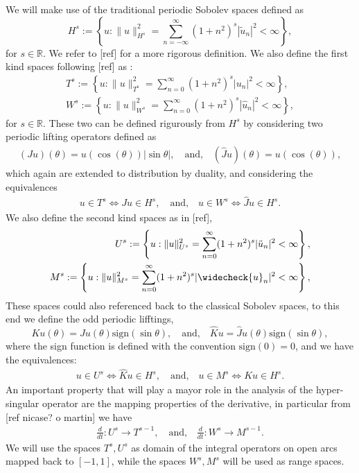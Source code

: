 \documentclass{article}
\newcommand{\todo}[1]{{\color{red}[#1]}}
\newcommand{\IR}{{\mathbb R}}
\begin{document}
We will make use of the traditional periodic Sobolev spaces defined as 
$$
H^s := \left\lbrace u : \| u\|_{H^s}^2 = \sum_{n=-\infty}^\infty (1+n^2)^s |\widetilde{u}_n|^2 < \infty \right\rbrace,
$$
for $s\in \IR$. We refer to \todo{ref} for a more rigorous definition. We also define the first kind spaces following \todo{ref} as : 
\begin{align*}
T^s := \left\lbrace u : \| u\|_{T^s}^2 = \sum_{n=0}^\infty (1+n^2)^s |{u}_n|^2 < \infty \right\rbrace, \\
W^s := \left\lbrace u : \| u\|_{W^s}^2 = \sum_{n=0}^\infty (1+n^2)^s |\widehat{u}_n|^2 < \infty \right\rbrace,
\end{align*} 
for $s \in \IR$. These two can be defined rigurously from $H^s$ by considering two periodic lifting operators defined as 
\begin{align}
\label{eq:liffings}
(Ju) (\theta) = u(\cos(\theta)) | \sin \theta|, \quad \text{and,} \quad
(\widehat{J}u)(\theta) = u (\cos(\theta)),
\end{align}
which again are extended to distribution by duality, and considering the equivalences 
\begin{align*}
u \in T^s \Leftrightarrow Ju \in H^s, \quad \text{and,} \quad u \in W^s \Leftrightarrow \widehat{J}u \in H^s.
\end{align*}
We also define the second kind spaces as in \todo{ref}, 
\begin{align*}
U^s := \left\lbrace u : \| u\|_{U^s}^2 = \sum_{n=0}^\infty (1+n^2)^s |\ddot{u}_n|^2 < \infty \right\rbrace, \\
M^s := \left\lbrace u : \| {u}\|_{M^s}^2 = \sum_{n=0}^\infty (1+n^2)^s |\widecheck{u}_n|^2 < \infty \right\rbrace,
\end{align*} 
These spaces could also referenced back to the classical Sobolev spaces, to this end we define the odd periodic lifftings, 
$$
Ku(\theta) = Ju(\theta) \text{sign}(\sin\theta), \quad \text{and,}\quad \widehat{K}u = \widehat{J}u(\theta) \text{sign}(\sin\theta),
$$
where the sign function is defined with the convention $\text{sign}(0)=0$, and we have the equivalences: 
\begin{align*}
u \in U^s \Leftrightarrow \widehat{K}u \in H^s, \quad \text{and,} \quad u \in M^s \Leftrightarrow Ku \in H^s.
\end{align*}
An important property that will play a mayor role in the analysis of the hyper-singular operator are the mapping properties of the derivative, in particular from \todo{ref nicase? o martin} we have 
\begin{align}
\label{eq:devprop}
\frac{d}{dt} : U^s \rightarrow T^{s-1}, \quad \text{and,} \quad 
\frac{d}{dt} : W^s \rightarrow M^{s-1}.
\end{align}
We will use the spaces $T^s,U^s$ as domain of the integral operators on open arcs mapped back to $[-1,1]$, while the spaces $W^s, M^s$ will be used as range spaces.
\end{document}
